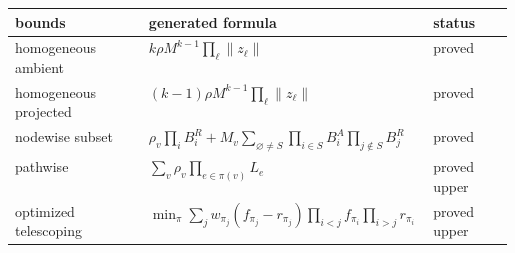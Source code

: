 \begin{tabular}{@{}lp{0.58\linewidth}l@{}}
\toprule
bounds & generated formula & status \\
\midrule
homogeneous ambient & $k\rho M^{k-1}\prod_\ell\lVert z_\ell\rVert$ & proved \\
homogeneous projected & $(k-1)\rho M^{k-1}\prod_\ell\lVert z_\ell\rVert$ & proved \\
nodewise subset & $\rho_v\prod_iB_i^R+M_v\sum_{\varnothing\ne S}\prod_{i\in S}B_i^A\prod_{j\notin S}B_j^R$ & proved \\
pathwise & $\sum_v\rho_v\prod_{e\in\pi(v)}L_e$ & proved upper \\
optimized telescoping & $\min_\pi\sum_j w_{\pi_j}(f_{\pi_j}-r_{\pi_j})\prod_{i<j}f_{\pi_i}\prod_{i>j}r_{\pi_i}$ & proved upper \\
\bottomrule
\end{tabular}

